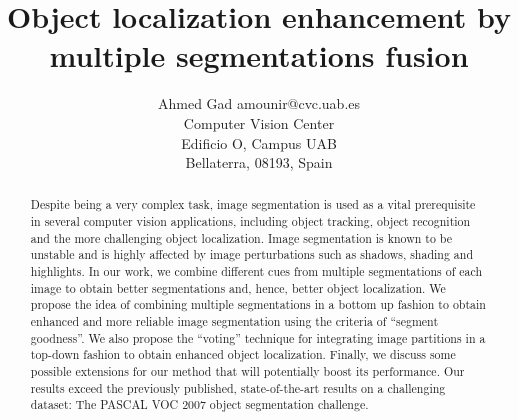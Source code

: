 \documentclass[twoside,11pt]{article}
\begin{document}



\newcommand{\dataset}{{\cal D}}
\newcommand{\fracpartial}[2]{\frac{\partial #1}{\partial  #2}}



\title{Object localization enhancement by multiple segmentations fusion}

\author{\name Ahmed Gad \email amounir@cvc.uab.es \\
       \addr Computer Vision Center\\
       Edificio O, Campus UAB\\
       Bellaterra, 08193, Spain
}


\maketitle

\begin{abstract}

Despite being a very complex task, image segmentation is used as a vital
prerequisite in several computer vision applications, including object tracking,
object recognition and the more challenging object localization. Image
segmentation is known to be unstable and is highly affected by image
perturbations such as shadows, shading and highlights. In our work, we combine
different cues from multiple segmentations of each image to obtain better
segmentations and, hence, better object localization. We propose the
idea of combining multiple segmentations in a bottom up fashion to obtain
enhanced and more reliable image segmentation using the criteria of ``segment
goodness''. We also propose the ``voting'' technique for integrating
image partitions in a top-down fashion to obtain enhanced object localization.
Finally, we discuss some possible extensions for our method that will potentially
boost its performance. Our results exceed the previously published,
state-of-the-art results on a challenging dataset: The PASCAL VOC 2007 object
segmentation challenge.

\end{abstract}
\end{document}
